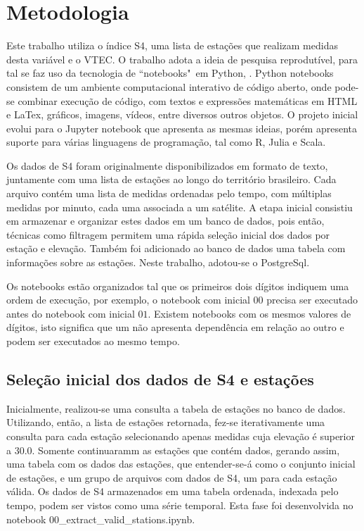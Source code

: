 \chapter{Metodologia}

Este trabalho utiliza o índice S4, uma lista de estações que realizam medidas desta variável e o VTEC. O trabalho adota a ideia de pesquisa reprodutível, para tal se faz uso da tecnologia de ``notebooks"~em Python, \cite{PEREZ:2007}. Python notebooks consistem de um ambiente computacional interativo de código aberto, onde pode-se combinar execução de código, com textos e expressões matemáticas em HTML e LaTex, gráficos, imagens, vídeos, entre diversos outros objetos. O projeto inicial evolui para o Jupyter notebook que apresenta as mesmas ideias, porém apresenta suporte para várias linguagens de programação, tal como R, Julia e Scala. 

Os dados de S4 foram originalmente disponibilizados em formato de texto, juntamente com uma lista de estações ao longo do território brasileiro. Cada arquivo contém uma lista de medidas ordenadas pelo tempo, com múltiplas medidas por minuto, cada uma associada a um satélite. A etapa inicial consistiu em armazenar e organizar estes dados em um banco de dados, pois então, técnicas como filtragem permitem uma rápida seleção inicial dos dados por estação e elevação. Também foi adicionado ao banco de dados uma tabela com informações sobre as estações. Neste trabalho, adotou-se o PostgreSql.

Os notebooks estão organizados tal que os primeiros dois dígitos indiquem uma ordem de execução, por exemplo, o notebook com inicial $00$ precisa ser executado antes do notebook com inicial $01$. Existem notebooks com os mesmos valores de dígitos, isto significa que um não apresenta dependência em relação ao outro e podem ser executados ao mesmo tempo.

\section{Seleção inicial dos dados de S4 e estações}

Inicialmente, realizou-se uma consulta a tabela de estações no banco de dados. Utilizando, então, a lista de estações retornada, fez-se iterativamente uma consulta para cada estação selecionando apenas medidas cuja elevação é superior a 30.0. Somente continuaramm as estações que contém dados, gerando assim, uma tabela com os dados das estações, que entender-se-á como o conjunto inicial de estações, e um grupo de arquivos com dados de S4, um para cada estação válida. Os dados de S4 armazenados em uma tabela ordenada, indexada pelo tempo, podem ser vistos como uma série temporal. Esta fase foi desenvolvida no notebook 00\_extract\_valid\_stations.ipynb. 

